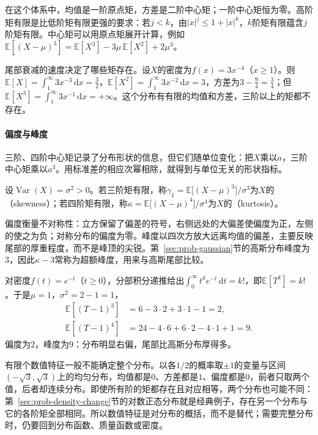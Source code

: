 在这个体系中，均值是一阶原点矩，方差是二阶中心矩；一阶中心矩恒为零。高阶矩有限是比低阶矩有限更强的要求：若$j<k$，由$|x|^j\leq1+|x|^k$，$k$阶矩有限蕴含$j$阶矩有限。中心矩可以用原点矩展开计算，例如$\mathbb{E}[(X-\mu)^3]=\mathbb{E}[X^3]-3\mu\,\mathbb{E}[X^2]+2\mu^3$。

尾部衰减的速度决定了哪些矩存在。设$X$的密度为$f(x)=3x^{-4}$（$x\geq1$）。则$\mathbb{E}[X]=\int_1^\infty3x^{-3}\,\mathrm{d}x=\frac32$，$\mathbb{E}[X^2]=\int_1^\infty3x^{-2}\,\mathrm{d}x=3$，方差为$3-\frac94=\frac34$；但$\mathbb{E}[X^3]=\int_1^\infty3x^{-1}\,\mathrm{d}x=+\infty$。这个分布有有限的均值和方差，三阶以上的矩都不存在。

\paragraph{偏度与峰度}
三阶、四阶中心矩记录了分布形状的信息，但它们随单位变化：把$X$乘以$a$，三阶中心矩乘以$a^3$。用标准差的相应次幂相除，就得到与单位无关的形状指标。

\begin{definition}[偏度与峰度]
\label{def:prob-skewness-kurtosis}
设$\operatorname{Var}(X)=\sigma^2>0$。若三阶矩有限，称$\gamma_1=\mathbb{E}\bigl[(X-\mu)^3\bigr]/\sigma^3$为$X$的（skewness）；若四阶矩有限，称$\kappa=\mathbb{E}\bigl[(X-\mu)^4\bigr]/\sigma^4$为$X$的（kurtosis）。
\end{definition}

偏度衡量不对称性：立方保留了偏差的符号，右侧远处的大偏差使偏度为正，左侧的使之为负；对称分布的偏度为零。峰度以四次方放大远离均值的偏差，主要反映尾部的厚重程度，而不是峰顶的尖锐。第~\ref{sec:prob-gaussian}节的高斯分布峰度为$3$，因此$\kappa-3$常称为超额峰度，用来与高斯尾部比较。

\begin{example}[等待时间的偏度与峰度]
\label{ex:prob-exponential-shape}
对密度$f(t)=e^{-t}$（$t\geq0$），分部积分递推给出$\int_0^\infty t^ke^{-t}\,\mathrm{d}t=k!$，即$\mathbb{E}[T^k]=k!$。于是$\mu=1$，$\sigma^2=2-1=1$，
\[
  \begin{aligned}
  \mathbb{E}[(T-1)^3]&=6-3\cdot2+3\cdot1-1=2,\\
  \mathbb{E}[(T-1)^4]&=24-4\cdot6+6\cdot2-4\cdot1+1=9 .
  \end{aligned}
\]
偏度为$2$，峰度为$9$：分布明显右偏，尾部比高斯分布厚得多。
\end{example}

有限个数值特征一般不能确定整个分布。以各$1/2$的概率取$\pm1$的变量与区间$(-\sqrt3,\sqrt3)$上的均匀分布，均值都是$0$、方差都是$1$、偏度都是$0$，前者只取两个值，后者却连续分布。即使所有阶的矩都存在且对应相等，两个分布也可能不同：第~\ref{sec:prob-density-change}节的对数正态分布就是经典例子，存在另一个分布与它的各阶矩全部相同。所以数值特征是对分布的概括，而不是替代；需要完整分布时，仍要回到分布函数、质量函数或密度。

